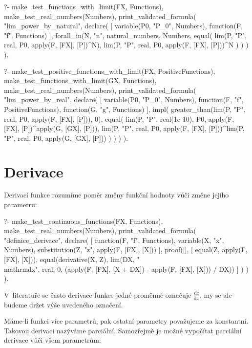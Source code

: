 \begin{prolog}
?-	make_test_functions_with_limit(FX, Functions),
	make_test_real_numbers(Numbers),
	print_validated_formula(
		"lim_power_by_natural",
		declare(
			[
				variable(P0, "P_0", Numbers),
				function(F, "f", Functions)
			],
			forall_in(N, "n", natural_numbers, Numbers,
				equal(
					lim(P, "P", real, P0, apply(F, [FX], [P])^N),
					lim(P, "P", real, P0, apply(F, [FX], [P]))^N
				)
			)
		)
	).
\end{prolog}

\begin{prolog}
?-	make_test_positive_functions_with_limit(FX, PositiveFunctions),
	make_test_functions_with_limit(GX, Functions),
	make_test_real_numbers(Numbers),
	print_validated_formula(
		"lim_power_by_real",
		declare(
			[
				variable(P0, "P_0", Numbers),
				function(F, "f", PositiveFunctions),
				function(G, "g", Functions)
			],
			impl(
				greater_than(lim(P, "P", real, P0, apply(F, [FX], [P])), 0),
				equal(
					lim(P, "P", real(1e-10), P0, apply(F, [FX], [P])^apply(G, [GX], [P])),
					lim(P, "P", real, P0, apply(F, [FX], [P]))^lim(P, "P", real, P0, apply(G, [GX], [P]))
				)
			)
		)
	).
\end{prolog}

\section{Derivace}

Derivací funkce rozumíme poměr změny funkční hodnoty vůči změne jejího parametru:

\begin{prolog}
?-	make_test_continuous_functions(FX, Functions),
	make_test_real_numbers(Numbers),
	print_validated_formula(
		"definice_derivace",
		declare(
			[
				function(F, "f", Functions),
				variable(X, "x", Numbers),
				substitution(Z, "z", apply(F, [FX], [X]))
			],
			proof([],
				[
					equal(Z, apply(F, [FX], [X])),
					equal(derivative(X, Z), lim(DX, "\\mathrm{d}x", real, 0, (apply(F, [FX], [X + DX]) - apply(F, [FX], [X])) / DX))
				]
			)
		)
	).
\end{prolog}

V~literatuře se často derivace funkce jedné proměnné označuje \(\frac{\mathrm{d}z}{\mathrm{d}x}\), my se ale budeme držet výše uvedeného označení. 

Máme-li funkci více parametrů, pak ostatní parametry považujeme za konstantní. Takovou derivaci nazýváme parciální. Samozřejmě je možné vypočítat parciální derivace vůči všem parametrům:

